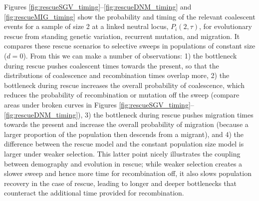 \documentclass[]{article}
\begin{document}
Figures \ref{fig:rescueSGV_timing}--\ref{fig:rescueDNM_timing} and \ref{fig:rescueMIG_timing} show the probability and timing of the relevant coalescent events for a sample of size 2 at a linked neutral locus, $P_i(2,\tau)$, for evolutionary rescue from standing genetic variation, recurrent mutation, and migration.
It compares these rescue scenarios to selective sweeps in populations of constant size ($d=0$). 
From this we can make a number of observations: 
1) the bottleneck during rescue pushes coalescent times towards the present, so that the distributions of coalescence and recombination times overlap more,
2) the bottleneck during rescue increases the overall probability of coalescence, which reduces the probability of recombination or mutation off the sweep (compare areas under broken curves in Figures \ref{fig:rescueSGV_timing}--\ref{fig:rescueDNM_timing}),
3) the bottleneck during rescue pushes migration times towards the present and increase the overall probability of migration (because a larger proportion of the population then descends from a migrant), and
4) the difference between the rescue model and the constant population size model is larger under weaker selection.
This latter point nicely illustrates the coupling between demography and evolution in rescue; while weaker selection creates a slower sweep and hence more time for recombination off, it also slows population recovery in the case of rescue, leading to longer and deeper bottlenecks that counteract the additional time provided for recombination.
\end{document}
